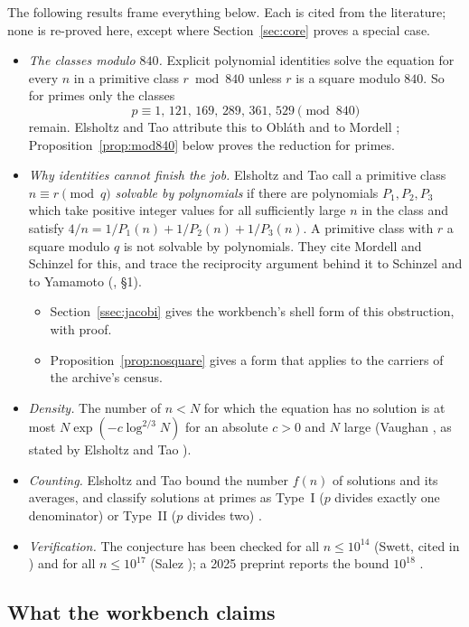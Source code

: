 The following results frame everything below. Each is cited from the literature; none is re-proved here, except where Section~\ref{sec:core} proves a special case.
\begin{itemize}
\item \emph{The classes modulo $840$.} Explicit polynomial identities solve the equation for every $n$ in a primitive class $r\bmod 840$ unless $r$ is a square modulo $840$. So for primes only the classes
\[
p\equiv1,\,121,\,169,\,289,\,361,\,529\pmod{840}
\]
remain. Elsholtz and Tao attribute this to Obláth and to Mordell \cite{ElsholtzTao,Mordell}; Proposition~\ref{prop:mod840} below proves the reduction for primes.
\item \emph{Why identities cannot finish the job.} Elsholtz and Tao \cite{ElsholtzTao} call a primitive class $n\equiv r\pmod q$ \emph{solvable by polynomials} if there are polynomials $P_1,P_2,P_3$ which take positive integer values for all sufficiently large $n$ in the class and satisfy $4/n=1/P_1(n)+1/P_2(n)+1/P_3(n)$. A primitive class with $r$ a square modulo $q$ is not solvable by polynomials. They cite Mordell and Schinzel for this, and trace the reciprocity argument behind it to Schinzel and to Yamamoto (\cite{ElsholtzTao}, §1).
\begin{itemize}
\item Section~\ref{ssec:jacobi} gives the workbench's shell form of this obstruction, with proof.
\item Proposition~\ref{prop:nosquare} gives a form that applies to the carriers of the archive's census.
\end{itemize}
\item \emph{Density.} The number of $n<N$ for which the equation has no solution is at most $N\exp(-c\log^{2/3}N)$ for an absolute $c>0$ and $N$ large (Vaughan \cite{Vaughan}, as stated by Elsholtz and Tao \cite{ElsholtzTao}).
\item \emph{Counting.} Elsholtz and Tao bound the number $f(n)$ of solutions and its averages, and classify solutions at primes as Type~I ($p$ divides exactly one denominator) or Type~II ($p$ divides two) \cite{ElsholtzTao}.
\item \emph{Verification.} The conjecture has been checked for all $n\le10^{14}$ (Swett, cited in \cite{ElsholtzTao}) and for all $n\le10^{17}$ (Salez \cite{Salez}); a 2025 preprint reports the bound $10^{18}$ \cite{MihneaDumitru}.
\end{itemize}

\subsection{What the workbench claims}

